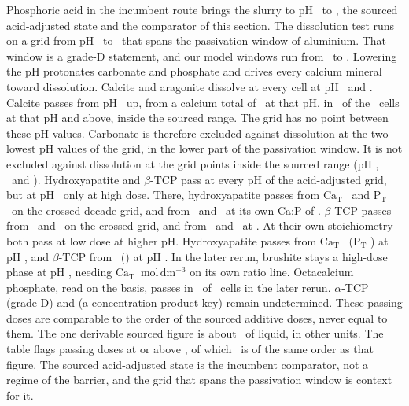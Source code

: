 Phosphoric acid in the incumbent route brings the slurry to pH \NumAcidSourcedLo\ to \NumAcidSourcedHi, the sourced acid-adjusted state and the comparator of this section. %
The dissolution test runs on a grid from pH \NumRegAcidPhLow\ to \NumRegAcidPhHigh\ that spans the passivation window of aluminium. %
That window is a grade-D statement, and our model windows run from \NumAcidModelLo\ to \NumAcidModelHi. %
Lowering the pH protonates carbonate and phosphate and drives every calcium mineral toward dissolution. %
Calcite and aragonite dissolve at every cell at pH \NumRegAcidExclLoCalcite\ and \NumRegAcidExclHiCalcite. %
Calcite passes from pH \NumRegAcidFirstCalcite\ up, from a calcium total of \NumRegAcidMinCaCalcite\ at that pH, in \NumRegAcidPassCalcite\ of the \NumRegAcidCellsAboveCalcite\ cells at that pH and above, inside the sourced range. %
The grid has no point between these pH values. %
Carbonate is therefore excluded against dissolution at the two lowest pH values of the grid, in the lower part of the passivation window. %
It is not excluded against dissolution at the grid points inside the sourced range (pH \NumRegPhGridSixFive, \NumRegPhGridSevenFive\ and \NumRegPhGridEightFive). %
Hydroxyapatite and $\beta$-TCP pass at every pH of the acid-adjusted grid, but at pH \NumRegAcidFirstHap\ only at high dose. %
There, hydroxyapatite passes from $\mathrm{Ca_T}$ \NumRegAcidMinCaHap\ and $\mathrm{P_T}$ \NumRegAcidMinPHap\ on the crossed decade grid, and from \NumRegAcidStoichCaHap\ and \NumRegAcidStoichPHap\ at its own Ca:P of \NumRatioHap. %
$\beta$-TCP passes from \NumRegAcidMinCaBtcp\ and \NumRegAcidMinPBtcp\ on the crossed grid, and from \NumRegAcidStoichCaBtcp\ and \NumRegAcidStoichPBtcp\ at \NumRatioTcp. %
At their own stoichiometry both pass at low dose at higher pH. %
Hydroxyapatite passes from $\mathrm{Ca_T}$ \NumRegOwnHapAcidCa\ ($\mathrm{P_T}$ \NumRegOwnHapAcidP) at pH \NumRegOwnHapAcidPh, and $\beta$-TCP from \NumRegOwnBtcpAcidCa\ (\NumRegOwnBtcpAcidP) at pH \NumRegOwnBtcpAcidPh. %
In the later rerun, brushite stays a high-dose phase at pH \NumRegPhGridFourFive, needing $\mathrm{Ca_T}$ \NumRegPhStoichCaBrushiteFourFive\,$\mathrm{mol\,dm^{-3}}$ on its own ratio line. %
Octacalcium phosphate, read on the  basis, passes in \NumRegRerunOcpCahAcidRerun\ of \NumRegRerunOcpCahAcidCells\ cells in the later rerun. %
$\alpha$-TCP (grade D) and  (a concentration-product key) remain undetermined. %
These passing doses are comparable to the order of the sourced additive doses, never equal to them. %
The one derivable sourced figure is about \NumDoseMolPerKgLiquid\ of liquid, in other units. %
The table flags passing doses at or above \NumRegHighDose, of which \NumRegDoseSameOrder\ is of the same order as that figure. %
The sourced acid-adjusted state is the incumbent comparator, not a regime of the barrier, and the grid that spans the passivation window is context for it. %


